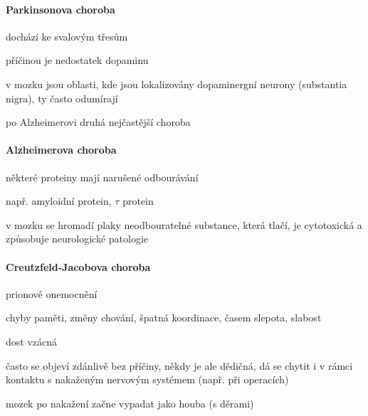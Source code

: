 \documentclass[DIV=8]{scrreprt}
\begin{document}
\paragraph{Parkinsonova choroba}
\begin{myItemize}[nosep]
    \item dochází ke svalovým třesům
    \item příčinou je nedostatek dopaminu
    \item v mozku jsou oblasti, kde jsou lokalizovány dopaminergní neurony (substantia nigra), ty často odumírají
    \item po Alzheimerovi druhá nejčastější choroba
\end{myItemize}



\paragraph{Alzheimerova choroba}
\begin{myItemize}[nosep]
    \item některé proteiny mají narušené odbourávání
\begin{myItemize}[nosep]
    \item např. amyloidní protein, \(\tau\) protein
\end{myItemize}

    \item v mozku se hromadí plaky neodbouratelné substance, která tlačí, je cytotoxická a způsobuje neurologické patologie
\end{myItemize}



\paragraph{Creutzfeld-Jacobova choroba}
\begin{myItemize}[nosep]
    \item prionové onemocnění
    \item chyby paměti, změny chování, špatná koordinace, časem slepota, slabost
    \item dost vzácná
    \item často se objeví zdánlivě bez příčiny, někdy je ale dědičná, dá se chytit i v rámci kontaktu s nakaženým nervovým systémem (např. při operacích)
    \item mozek po nakažení začne vypadat jako houba (s děrami)
\end{myItemize}
\end{document}
